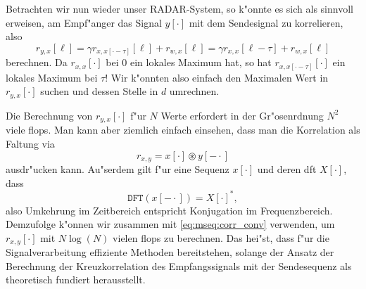 Betrachten wir nun wieder unser RADAR-System, so k"onnte es sich als sinnvoll erweisen, am Empf"anger das Signal $y[\cdot]$ mit dem Sendesignal zu korrelieren, also
\[
r_{y,x}[\ell] 
    = \gamma r_{x,x[\cdot-\tau]}[\ell] + r_{w,x}[\ell]
    = \gamma r_{x,x}[\ell-\tau] + r_{w,x}[\ell]
\]
berechnen.
Da $r_{x,x}[\cdot]$ bei $0$ ein lokales Maximum hat, so hat $r_{x,x[\cdot-\tau]}[\cdot]$ ein lokales Maximum bei $\tau$!
Wir k"onnten also einfach den Maximalen Wert in $r_{y,x}[\cdot]$ suchen und dessen Stelle in $d$ umrechnen.

Die Berechnung von $r_{y,x}[\cdot]$ f"ur $N$ Werte erfordert in der Gr"osenrdnung $N^2$ viele \glspl{flop}.
Man kann aber ziemlich einfach einsehen, dass man die Korrelation als Faltung via
\begin{equation}\label{eq:mseq:corr_conv}
    r_{x,y} = x[\cdot] \circledast y[-\cdot]
\end{equation}
ausdr"ucken kann.
Au"serdem gilt f"ur eine Sequenz $x[\cdot]$ und deren \gls{dft} $X[\cdot]$, dass
\begin{equation}\label{eq:mseq:dft_fold}
    \texttt{DFT}(x[-\cdot]) = X[\cdot]^\ast,
\end{equation}
also Umkehrung im Zeitbereich entspricht Konjugation im Frequenzbereich.
Demzufolge k"onnen wir  zusammen mit \eqref{eq:mseq:corr_conv} verwenden, um $r_{x,y}[\cdot]$ mit $N \log(N)$ vielen \glspl{flop} zu berechnen.
Das hei"st, dass f"ur die Signalverarbeitung effiziente Methoden bereitstehen, solange der Ansatz der Berechnung der Kreuzkorrelation des Empfangssignals mit der Sendesequenz als theoretisch fundiert herausstellt.
%

